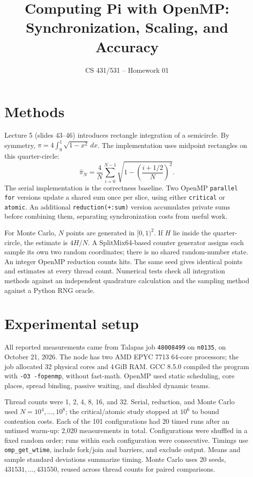 \documentclass[11pt,twocolumn]{article}
\title{Computing Pi with OpenMP:\\Synchronization, Scaling, and Accuracy}
\author{CS 431/531 -- Homework 01}
\date{}
\begin{document}
\maketitle

\section{Methods}
Lecture 5 (slides 43--46) introduces rectangle integration of a semicircle.
By symmetry, $\pi=4\int_0^1\sqrt{1-x^2}\,dx$. The implementation uses
midpoint rectangles on this quarter-circle:
\[
 \widehat{\pi}_N=\frac{4}{N}\sum_{i=0}^{N-1}
 \sqrt{1-\left(\frac{i+1/2}{N}\right)^2}.
\]
The serial implementation is the correctness baseline. Two OpenMP
\texttt{parallel for} versions update a shared sum once per slice,
using either \texttt{critical} or \texttt{atomic}. An additional
\texttt{reduction(+:sum)} version accumulates private sums before combining
them, separating synchronization costs from useful work.

For Monte Carlo, $N$ points are generated in $[0,1)^2$. If $H$ lie inside
the quarter-circle, the estimate is $4H/N$. A SplitMix64-based counter
generator assigns each sample its own two random coordinates; there is no
shared random-number state. An integer OpenMP reduction counts hits.
The same seed gives identical points and estimates at every thread count.
Numerical tests check all integration methods against an independent
quadrature calculation and the sampling method against a Python RNG oracle.

\section{Experimental setup}
All reported measurements came from Talapas job \texttt{48008499} on
\texttt{n0135}, on October 21, 2026. The node has two AMD EPYC 7713
64-core processors; the job allocated 32 physical cores and 4\,GiB RAM.
GCC 8.5.0 compiled the program with \texttt{-O3 -fopenmp}, without
fast-math. OpenMP used static scheduling, core places, spread binding,
passive waiting, and disabled dynamic teams.

Thread counts were 1, 2, 4, 8, 16, and 32. Serial, reduction, and Monte
Carlo used $N=10^4,\ldots,10^8$; the critical/atomic study stopped at
$10^6$ to bound contention costs. Each of the 101 configurations had
20 timed runs after an untimed warm-up: 2,020 measurements in total.
Configurations were shuffled in a fixed random order; runs within each
configuration were consecutive. Timings use \texttt{omp\_get\_wtime},
include fork/join and barriers, and exclude output. Means and sample
standard deviations summarize timing. Monte Carlo uses 20 seeds,
$431531,\ldots,431550$, reused across thread counts for paired comparisons.
\end{document}
